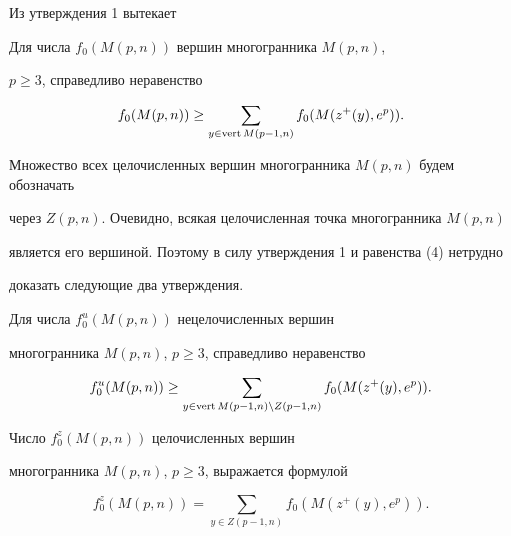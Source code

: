 Из утверждения 1 вытекает





\begin{assrt}


Для числа $f_0(M(p,n))$ вершин многогранника $M(p,n)$,


$p\geq 3$, справедливо неравенство


$$


f_0(M(p,n))\geq\sum_{y\in\vrt M(p-1,n)}{f_0(M(z^+(y),e^p))}.


$$


\end{assrt}





Множество всех целочисленных вершин многогранника $M(p,n)$ будем обозначать


через $Z(p,n)$. Очевидно, всякая целочисленная точка многогранника $M(p,n)$


является его вершиной. Поэтому в силу утверждения 1 и равенства (4) нетрудно


доказать следующие два утверждения.





\begin{assrt}


Для числа $f^u_0(M(p,n))$ нецелочисленных вершин


многогранника $M(p,n)$, $p\geq 3$, справедливо неравенство


$$


f^u_0(M(p,n))\geq\sum_{y\in\vrt M(p-1,n)\setminus Z(p-1,n)}


{f_0(M(z^+(y),e^p))}.


$$


\end{assrt}





\begin{assrt}


Число $f^z_0(M(p,n))$ целочисленных вершин


многогранника $M(p,n)$, $p\geq 3$, выражается формулой


$$


f^z_0(M(p,n))=\sum_{y\in Z(p-1,n)}{f_0(M(z^+(y),e^p))}.


$$


\end{assrt}





